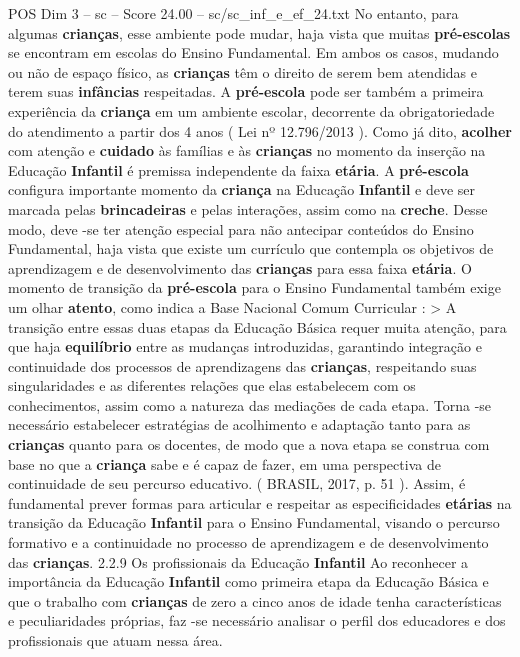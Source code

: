 \begin{textsample}{POS Dim 3 – sc – Score 24.00 – sc/sc\_inf\_e\_ef\_24.txt}
No entanto, para algumas \textbf{crianças}, esse ambiente pode mudar, haja vista que muitas \textbf{pré-escolas} se encontram em escolas do Ensino Fundamental.
Em ambos os casos, mudando ou não de espaço físico, as \textbf{crianças} têm o direito de serem bem atendidas e terem suas \textbf{infâncias} respeitadas.
A \textbf{pré-escola} pode ser também a primeira experiência da \textbf{criança} em um ambiente escolar, decorrente da obrigatoriedade do atendimento a partir dos 4 anos ( Lei nº 12.796/2013 ).
Como já dito, \textbf{acolher} com atenção e \textbf{cuidado} às famílias e às \textbf{crianças} no momento da inserção na Educação \textbf{Infantil} é premissa independente da faixa \textbf{etária}.
A \textbf{pré-escola} configura importante momento da \textbf{criança} na Educação \textbf{Infantil} e deve ser marcada pelas \textbf{brincadeiras} e pelas interações, assim como na \textbf{creche}.
Desse modo, deve -se ter atenção especial para não antecipar conteúdos do Ensino Fundamental, haja vista que existe um currículo que contempla os objetivos de aprendizagem e de desenvolvimento das \textbf{crianças} para essa faixa \textbf{etária}.
O momento de transição da \textbf{pré-escola} para o Ensino Fundamental também exige um olhar \textbf{atento}, como indica a Base Nacional Comum Curricular : > A transição entre essas duas etapas da Educação Básica requer muita atenção, para que haja \textbf{equilíbrio} entre as mudanças introduzidas, garantindo integração e continuidade dos processos de aprendizagens das \textbf{crianças}, respeitando suas singularidades e as diferentes relações que elas estabelecem com os conhecimentos, assim como a natureza das mediações de cada etapa.
Torna -se necessário estabelecer estratégias de acolhimento e adaptação tanto para as \textbf{crianças} quanto para os docentes, de modo que a nova etapa se construa com base no que a \textbf{criança} sabe e é capaz de fazer, em uma perspectiva de continuidade de seu percurso educativo. ( BRASIL, 2017, p. 51 ).
Assim, é fundamental prever formas para articular e respeitar as especificidades \textbf{etárias} na transição da Educação \textbf{Infantil} para o Ensino Fundamental, visando o percurso formativo e a continuidade no processo de aprendizagem e de desenvolvimento das \textbf{crianças}. 2.2.9 Os profissionais da Educação \textbf{Infantil} Ao reconhecer a importância da Educação \textbf{Infantil} como primeira etapa da Educação Básica e que o trabalho com \textbf{crianças} de zero a cinco anos de idade tenha características e peculiaridades próprias, faz -se necessário analisar o perfil dos educadores e dos profissionais que atuam nessa área.

\end{textsample}
